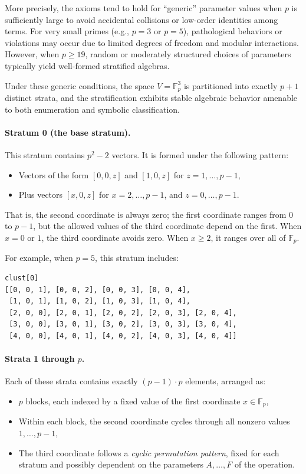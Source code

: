 \documentclass[12pt]{article}
\theoremstyle{definition}
\theoremstyle{plain}
\theoremstyle{remark}
\begin{document}
More precisely, the axioms tend to hold for “generic” parameter values when \( p \) is sufficiently large to avoid accidental collisions or low-order identities among terms. For very small primes (e.g., \( p = 3 \) or \( p = 5 \)), pathological behaviors or violations may occur due to limited degrees of freedom and modular interactions. However, when \( p \geq 19 \), random or moderately structured choices of parameters typically yield well-formed stratified algebras.

Under these generic conditions, the space \( V = \mathbb{F}_p^3 \) is partitioned into exactly \( p + 1 \) distinct strata, and the stratification exhibits stable algebraic behavior amenable to both enumeration and symbolic classification.

\paragraph{Stratum 0 (the base stratum).} This stratum contains \( p^2 - 2 \) vectors. It is formed under the following pattern:
\begin{itemize}
    \item Vectors of the form \([0, 0, z]\) and \([1, 0, z]\) for \( z = 1, \dots, p-1 \),
    \item Plus vectors \([x, 0, z]\) for \( x = 2, \dots, p-1 \), and \( z = 0, \dots, p-1 \).
\end{itemize}

That is, the second coordinate is always zero; the first coordinate ranges from 0 to \( p-1 \), but the allowed values of the third coordinate depend on the first. When \( x = 0 \) or \( 1 \), the third coordinate avoids zero. When \( x \geq 2 \), it ranges over all of \( \mathbb{F}_p \).

For example, when \( p = 5 \), this stratum includes:
\begin{verbatim}
clust[0]
[[0, 0, 1], [0, 0, 2], [0, 0, 3], [0, 0, 4],
 [1, 0, 1], [1, 0, 2], [1, 0, 3], [1, 0, 4],
 [2, 0, 0], [2, 0, 1], [2, 0, 2], [2, 0, 3], [2, 0, 4],
 [3, 0, 0], [3, 0, 1], [3, 0, 2], [3, 0, 3], [3, 0, 4],
 [4, 0, 0], [4, 0, 1], [4, 0, 2], [4, 0, 3], [4, 0, 4]]
\end{verbatim}

\paragraph{Strata 1 through \( p \).} Each of these strata contains exactly \( (p-1) \cdot p \) elements, arranged as:
\begin{itemize}
    \item \( p \) blocks, each indexed by a fixed value of the first coordinate \( x \in \mathbb{F}_p \),
    \item Within each block, the second coordinate cycles through all nonzero values \( 1, \dots, p-1 \),
    \item The third coordinate follows a \emph{cyclic permutation pattern}, fixed for each stratum and possibly dependent on the parameters \( A, \dots, F \) of the operation.
\end{itemize}
\end{document}
